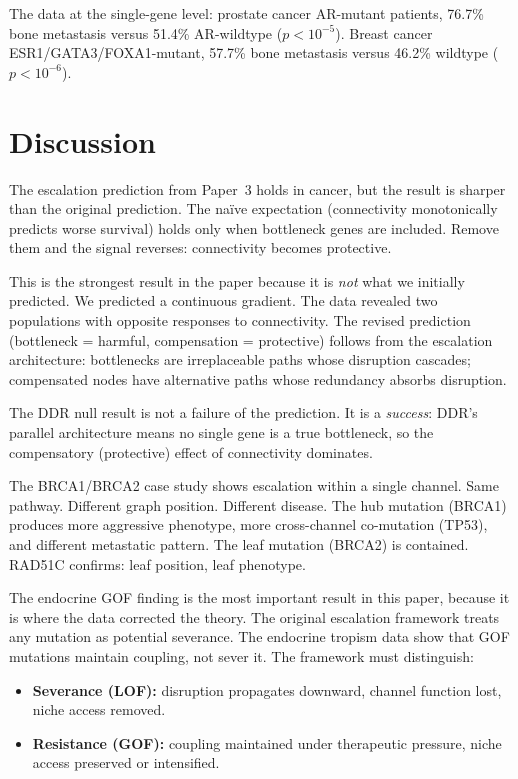 \documentclass[11pt]{article}
\begin{document}
The data at the single-gene level: prostate cancer AR-mutant
patients, 76.7\% bone metastasis versus 51.4\% AR-wildtype
($p < 10^{-5}$). Breast cancer ESR1/GATA3/FOXA1-mutant, 57.7\%
bone metastasis versus 46.2\% wildtype ($p < 10^{-6}$).

\section{Discussion}
\label{sec:discussion}

The escalation prediction from Paper~3 holds in cancer, but
the result is sharper than the original prediction. The na\"ive
expectation (connectivity monotonically predicts worse survival)
holds only when bottleneck genes are included. Remove them and
the signal reverses: connectivity becomes protective.

This is the strongest result in the paper because it is
\emph{not} what we initially predicted. We predicted a
continuous gradient. The data revealed two populations with
opposite responses to connectivity. The revised prediction
(bottleneck = harmful, compensation = protective) follows from
the escalation architecture: bottlenecks are irreplaceable paths
whose disruption cascades; compensated nodes have alternative
paths whose redundancy absorbs disruption.

The DDR null result is not a failure of the prediction. It is a
\emph{success}: DDR's parallel architecture means no single gene
is a true bottleneck, so the compensatory (protective) effect of
connectivity dominates.

The BRCA1/BRCA2 case study shows escalation within a single
channel. Same pathway. Different graph position. Different disease.
The hub mutation (BRCA1) produces more aggressive phenotype, more
cross-channel co-mutation (TP53), and different metastatic pattern.
The leaf mutation (BRCA2) is contained. RAD51C confirms: leaf
position, leaf phenotype.

The endocrine GOF finding is the most important result in this
paper, because it is where the data corrected the theory. The
original escalation framework treats any mutation as potential
severance. The endocrine tropism data show that GOF mutations
maintain coupling, not sever it. The framework must distinguish:

\begin{itemize}
\item \textbf{Severance (LOF):} disruption propagates downward,
channel function lost, niche access removed.
\item \textbf{Resistance (GOF):} coupling maintained under
therapeutic pressure, niche access preserved or intensified.
\end{itemize}
\end{document}
